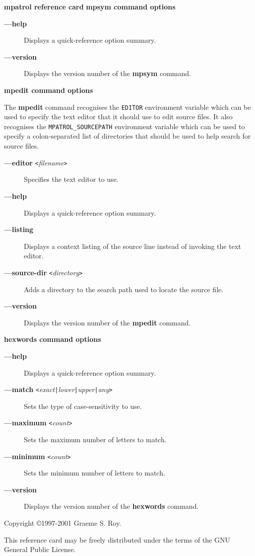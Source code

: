 \documentclass[a4paper,landscape,final]{article}
\newcommand{\heading}[1]{\textbf{\normalsize #1}}
\newcommand{\command}[1]{\textbf{#1}}
\newcommand{\flag}[1]{\textbf{---#1}}
\newcommand{\flagpar}[2]{\flag{#1} \texttt{<}\textit{#2}\texttt{>}}
\begin{document}
\begin{multicols}{3}{\textbf{\Large mpatrol reference card}}
\vskip 12pt
\heading{mpsym command options}
\vskip 6pt

\begin{description}
\item[\flag{help}]
Displays a quick-reference option summary.
\item[\flag{version}]
Displays the version number of the \command{mpsym} command.
\end{description}

\vskip 12pt
\heading{mpedit command options}
\vskip 6pt

The \command{mpedit} command recognises the \texttt{EDITOR} environment variable
which can be used to specify the text editor that it should use to edit source
files.  It also recognises the \texttt{MPATROL\_SOURCEPATH} environment variable
which can be used to specify a colon-separated list of directories that should
be used to help search for source files.

\begin{description}
\item[\flagpar{editor}{filename}]
Specifies the text editor to use.
\item[\flag{help}]
Displays a quick-reference option summary.
\item[\flag{listing}]
Displays a context listing of the source line instead of invoking the text
editor.
\item[\flagpar{source-dir}{directory}]
Adds a directory to the search path used to locate the source file.
\item[\flag{version}]
Displays the version number of the \command{mpedit} command.
\end{description}

\vskip 12pt
\heading{hexwords command options}
\vskip 6pt

\begin{description}
\item[\flag{help}]
Displays a quick-reference option summary.
\item[\flagpar{match}{exact\texttt{|}lower\texttt{|}upper\texttt{|}any}]
Sets the type of case-sensitivity to use.
\item[\flagpar{maximum}{count}]
Sets the maximum number of letters to match.
\item[\flagpar{minimum}{count}]
Sets the minimum number of letters to match.
\item[\flag{version}]
Displays the version number of the \command{hexwords} command.
\end{description}

\vskip 12pt
Copyright \copyright 1997-2001 Graeme S. Roy.
\vskip 6pt

This reference card may be freely distributed under the terms of the GNU General
Public License.

\end{multicols}
\end{document}
